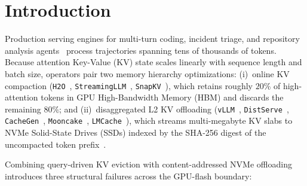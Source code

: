 \documentclass[10pt,journal,compsoc]{IEEEtran}
\theoremstyle{definition}
\theoremstyle{remark}
\begin{document}
\maketitle
\IEEEdisplaynontitleabstractindextext
\IEEEpeerreviewmaketitle

\section{Introduction}

Production serving engines for multi-turn coding, incident triage, and repository analysis agents~\cite{jimenez2024swebench,zheng2024sglang} process trajectories spanning tens of thousands of tokens. Because attention Key-Value (KV) state scales linearly with sequence length and batch size, operators pair two memory hierarchy optimizations: (i)~online KV compaction (\texttt{H2O}~\cite{zhang2023h2o}, \texttt{StreamingLLM}~\cite{xiao2024streamingllm}, \texttt{SnapKV}~\cite{li2024snapkv}), which retains roughly $20\%$ of high-attention tokens in GPU High-Bandwidth Memory (HBM) and discards the remaining $80\%$; and (ii)~disaggregated L2 KV offloading (\texttt{vLLM}~\cite{kwon2023vllm}, \texttt{DistServe}~\cite{zhong2024distserve}, \texttt{CacheGen}~\cite{liu2024cachegen}, \texttt{Mooncake}~\cite{qin2025mooncake}, \texttt{LMCache}~\cite{cheng2025lmcache}), which streams multi-megabyte KV slabs to NVMe Solid-State Drives (SSDs) indexed by the SHA-256 digest of the uncompacted token prefix~\cite{quinlan2002venti}.

Combining query-driven KV eviction with content-addressed NVMe offloading introduces three structural failures across the GPU-flash boundary:
\end{document}
